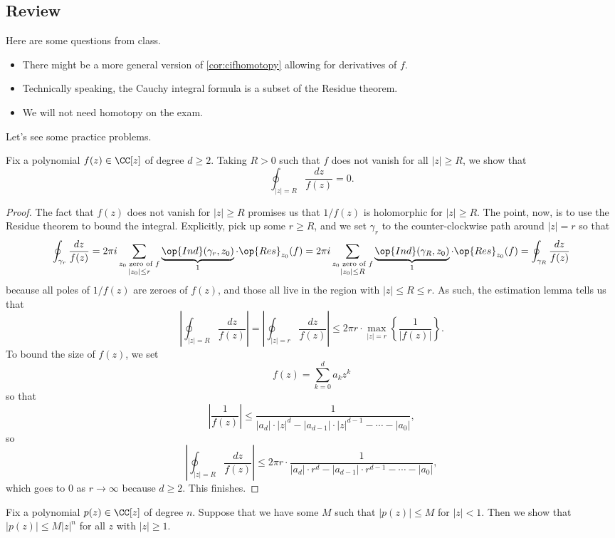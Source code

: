 \subsection{Review}
Here are some questions from class.
\begin{itemize}
	\item There might be a more general version of \autoref{cor:cifhomotopy} allowing for derivatives of $f$.
	\item Technically speaking, the Cauchy integral formula is a subset of the Residue theorem.
	\item We will not need homotopy on the exam.
\end{itemize}
Let's see some practice problems.
\begin{exe}
	Fix a polynomial $f(z)\in\CC[z]$ of degree $d\ge2$. Taking $R>0$ such that $f$ does not vanish for all $|z|\ge R$, we show that
	\[\oint_{|z|=R}\frac{dz}{f(z)}=0.\]
\end{exe}
\begin{proof}
	The fact that $f(z)$ does not vanish for $|z|\ge R$ promises us that $1/f(z)$ is holomorphic for $|z|\ge R$. The point, now, is to use the Residue theorem to bound the integral. Explicitly, pick up some $r\ge R$, and we set $\gamma_r$ to the counter-clockwise path around $|z|=r$ so that
	\[\oint_{\gamma_r}\frac{dz}{f(z)}=2\pi i\sum_{\substack{z_0\text{ zero of }f\\|z_0|\le r}}\underbrace{\op{Ind}(\gamma_r,z_0)}_1\cdot\op{Res}_{z_0}(f)=2\pi i\sum_{\substack{z_0\text{ zero of }f\\|z_0|\le R}}\underbrace{\op{Ind}(\gamma_R,z_0)}_1\cdot\op{Res}_{z_0}(f)=\oint_{\gamma_R}\frac{dz}{f(z)}\]
	because all poles of $1/f(z)$ are zeroes of $f(z)$, and those all live in the region with $|z|\le R\le r$. As such, the estimation lemma tells us that
	\[\left|\oint_{|z|=R}\frac{dz}{f(z)}\right|=\left|\oint_{|z|=r}\frac{dz}{f(z)}\right|\le2\pi r\cdot\max_{|z|=r}\left\{\frac1{|f(z)|}\right\}.\]
	To bound the size of $f(z)$, we set
	\[f(z)=\sum_{k=0}^da_kz^k\]
	so that
	\[\left|\frac1{f(z)}\right|\le\frac1{|a_d|\cdot |z|^d-|a_{d-1}|\cdot|z|^{d-1}-\cdots-|a_0|},\]
	so
	\[\left|\oint_{|z|=R}\frac{dz}{f(z)}\right|\le2\pi r\cdot\frac1{|a_d|\cdot r^d-|a_{d-1}|\cdot r^{d-1}-\cdots-|a_0|},\]
	which goes to $0$ as $r\to\infty$ because $d\ge2$. This finishes.
\end{proof}
\begin{exe}
	Fix a polynomial $p(z)\in\CC[z]$ of degree $n$. Suppose that we have some $M$ such that $|p(z)|\le M$ for $|z|<1$. Then we show that $|p(z)|\le M|z|^n$ for all $z$ with $|z|\ge1$.
\end{exe}
